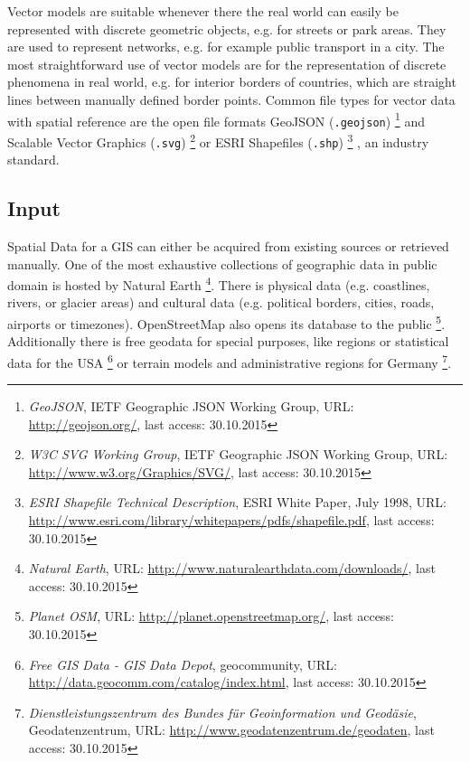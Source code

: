 Vector models are suitable whenever there the real world can easily be represented with discrete geometric objects, e.g. for streets or park areas. They are used to represent networks, e.g. for example public transport in a city. The most straightforward use of vector models are for the representation of discrete phenomena in real world, e.g. for interior borders of countries, which are straight lines between manually defined border points. Common file types for vector data with spatial reference are the open file formats GeoJSON (\texttt{.geojson})
\footnote{
  \textit{GeoJSON},
  IETF Geographic JSON Working Group,
  URL: \url{http://geojson.org/},
  last access: 30.10.2015
}
and Scalable Vector Graphics (\texttt{.svg})
\footnote{
  \textit{W3C SVG Working Group},
  IETF Geographic JSON Working Group,
  URL: \url{http://www.w3.org/Graphics/SVG/},
  last access: 30.10.2015
}
or ESRI Shapefiles (\texttt{.shp})
\footnote{
  \textit{ESRI Shapefile Technical Description},
  ESRI White Paper, July 1998,
  URL: \url{http://www.esri.com/library/whitepapers/pdfs/shapefile.pdf},
  last access: 30.10.2015
}
, an industry standard.




\subsection{Input} %
\label{sub:input}

Spatial Data for a GIS can either be acquired from existing sources or retrieved manually. One of the most exhaustive collections of geographic data in public domain is hosted by Natural Earth
\footnote{
  \textit{Natural Earth},
  URL: \url{http://www.naturalearthdata.com/downloads/},
  last access: 30.10.2015
}.
There is physical data (e.g. coastlines, rivers, or glacier areas) and cultural data (e.g. political borders, cities, roads, airports or timezones). OpenStreetMap also opens its database to the public
\footnote{
  \textit{Planet OSM},
  URL: \url{http://planet.openstreetmap.org/},
  last access: 30.10.2015
}.
Additionally there is free geodata for special purposes, like regions or statistical data for the USA
\footnote{
  \textit{Free GIS Data - GIS Data Depot},
  geocommunity,
  URL: \url{http://data.geocomm.com/catalog/index.html},
  last access: 30.10.2015
}
or terrain models and administrative regions for Germany
\footnote{
  \textit{Dienstleistungszentrum des Bundes für Geoinformation und Geodäsie},
  Geodatenzentrum,
  URL: \url{http://www.geodatenzentrum.de/geodaten},
  last access: 30.10.2015
}.


